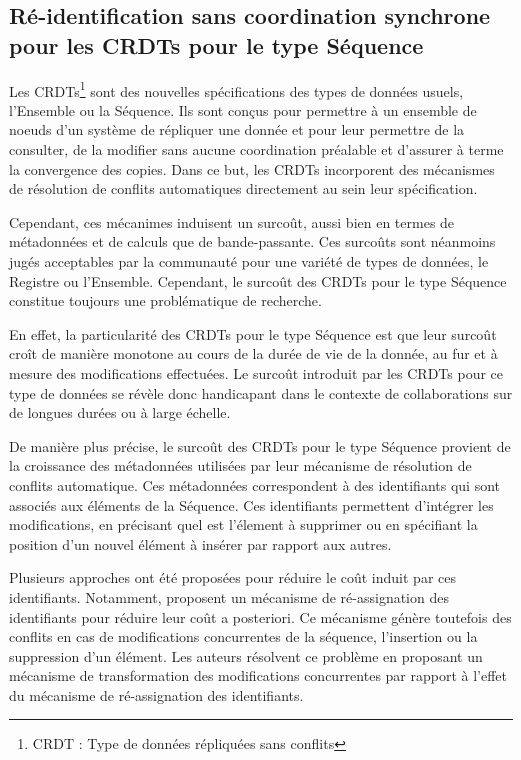 \subsection{Ré-identification sans coordination synchrone pour les \acp{CRDT} pour le type Séquence}
\label{sec:research-questions-rls}

Les \acfp{CRDT}\footnote{\acf{CRDT} : Type de données répliquées sans conflits} \cite{2007-crdt-shapiro,shapiro_2011_crdt} sont des nouvelles spécifications des types de données usuels, \eg l'Ensemble ou la Séquence.
Ils sont conçus pour permettre à un ensemble de noeuds d'un système de répliquer une donnée et pour leur permettre de la consulter, de la modifier sans aucune coordination préalable et d'assurer à terme la convergence des copies.
Dans ce but, les \acp{CRDT} incorporent des mécanismes de résolution de conflits automatiques directement au sein leur spécification.

Cependant, ces mécanimes induisent un surcoût, aussi bien en termes de métadonnées et de calculs que de bande-passante.
Ces surcoûts sont néanmoins jugés acceptables par la communauté pour une variété de types de données, \eg le Registre ou l'Ensemble.
Cependant, le surcoût des \acp{CRDT} pour le type Séquence constitue toujours une problématique de recherche.

En effet, la particularité des \acp{CRDT} pour le type Séquence est que leur surcoût croît de manière monotone au cours de la durée de vie de la donnée, \ie au fur et à mesure des modifications effectuées.
Le surcoût introduit par les \acp{CRDT} pour ce type de données se révèle donc handicapant dans le contexte de collaborations sur de longues durées ou à large échelle.

De manière plus précise, le surcoût des \acp{CRDT} pour le type Séquence provient de la croissance des métadonnées utilisées par leur mécanisme de résolution de conflits automatique.
Ces métadonnées correspondent à des identifiants qui sont associés aux éléments de la Séquence.
Ces identifiants permettent d'intégrer les modifications, \eg en précisant quel est l'élement à supprimer ou en spécifiant la position d'un nouvel élément à insérer par rapport aux autres.

Plusieurs approches ont été proposées pour réduire le coût induit par ces identifiants.
Notamment, \cite{letia:hal-01248270,zawirski:hal-01248197} proposent un mécanisme de ré-assignation des identifiants pour réduire leur coût a posteriori.
Ce mécanisme génère toutefois des conflits en cas de modifications concurrentes de la séquence, \ie l'insertion ou la suppression d'un élément.
Les auteurs résolvent ce problème en proposant un mécanisme de transformation des modifications concurrentes par rapport à l'effet du mécanisme de ré-assignation des identifiants.

